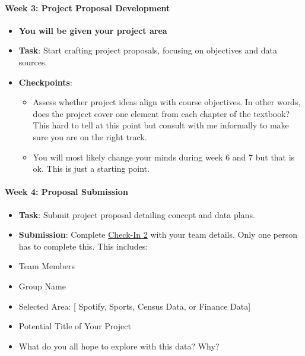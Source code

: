 \documentclass[
  letterpaper,
  DIV=11,
  numbers=noendperiod]{scrartcl}
\let\oldparagraph\paragraph
\renewcommand{\paragraph}[1]{\oldparagraph{#1}\mbox{}}
\providecommand{\tightlist}{%
  \setlength{\itemsep}{0pt}\setlength{\parskip}{0pt}}\usepackage{longtable,booktabs,array}
\begin{document}
\hypertarget{week-3-project-proposal-development}{%
\paragraph{Week 3: Project Proposal
Development}\label{week-3-project-proposal-development}}

\begin{itemize}
\item
  \textbf{You will be given your project area}
\item
  \textbf{Task}: Start crafting project proposals, focusing on
  objectives and data sources.
\item
  \textbf{Checkpoints}:

  \begin{itemize}
  \tightlist
  \item
    Assess whether project ideas align with course objectives. In other
    words, does the project cover one element from each chapter of the
    textbook? This hard to tell at this point but consult with me
    informally to make sure you are on the right track.
  \item
    You will most likely change your minds during week 6 and 7 but that
    is ok. This is just a starting point.
  \end{itemize}
\end{itemize}

\hypertarget{week-4-proposal-submission}{%
\paragraph{Week 4: Proposal
Submission}\label{week-4-proposal-submission}}

\begin{itemize}
\item
  \textbf{Task}: Submit project proposal detailing concept and data
  plans.
\item
  \textbf{Submission}: Complete
  \href{https://forms.gle/xiJNcRqwnwLD36qh8}{Check-In 2} with your team
  details. Only one person has to complete this. This includes:
\item
  Team Members
\item
  Group Name
\item
  Selected Area: {[} Spotify, Sports, Census Data, or Finance Data{]}
\item
  Potential Title of Your Project
\item
  What do you all hope to explore with this data? Why?
\end{itemize}
\end{document}
